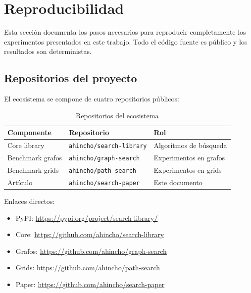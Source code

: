 \section{Reproducibilidad}

Esta sección documenta los pasos necesarios para reproducir completamente los experimentos presentados en este trabajo. Todo el código fuente es público y los resultados son deterministas.

\subsection{Repositorios del proyecto}

El ecosistema se compone de cuatro repositorios públicos:

\begin{table}[H]
\centering
\caption{Repositorios del ecosistema}
\label{tab:repos}
\renewcommand{\arraystretch}{1.3}
\begin{tabular}{@{}lll@{}}
\toprule
\textbf{Componente} & \textbf{Repositorio} & \textbf{Rol} \\
\midrule
Core library & \texttt{ahincho/search-library} & Algoritmos de búsqueda \\
Benchmark grafos & \texttt{ahincho/graph-search} & Experimentos en grafos \\
Benchmark grids & \texttt{ahincho/path-search} & Experimentos en grids \\
Artículo & \texttt{ahincho/search-paper} & Este documento \\
\bottomrule
\end{tabular}
\end{table}

Enlaces directos:
\begin{itemize}
    \item PyPI: \url{https://pypi.org/project/search-library/}
    \item Core: \url{https://github.com/ahincho/search-library}
    \item Grafos: \url{https://github.com/ahincho/graph-search}
    \item Grids: \url{https://github.com/ahincho/path-search}
    \item Paper: \url{https://github.com/ahincho/search-paper}
\end{itemize}

